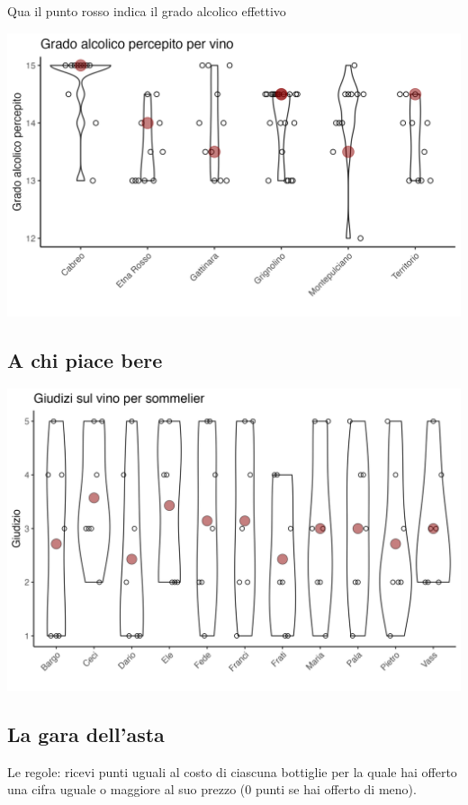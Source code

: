 \documentclass[
]{article}
\begin{document}
Qua il punto rosso indica il grado alcolico effettivo

\includegraphics[width=1\linewidth]{plots/ethobywine}

\hypertarget{a-chi-piace-bere}{%
\subsection{A chi piace bere}\label{a-chi-piace-bere}}

\includegraphics[width=1\linewidth]{plots/rating_per_sommelier}

\hypertarget{la-gara-dellasta}{%
\subsection{La gara dell'asta}\label{la-gara-dellasta}}

Le regole: ricevi punti uguali al costo di ciascuna bottiglie per la
quale hai offerto una cifra uguale o maggiore al suo prezzo (0 punti se
hai offerto di meno).
\end{document}
